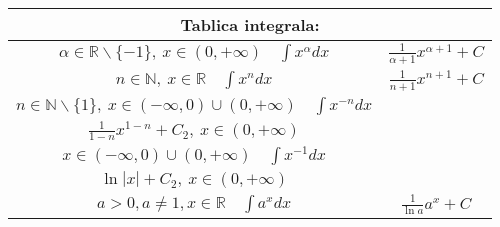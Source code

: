 \documentclass{article}
\begin{document}
\setlength{\tabcolsep}{2.65em}
\renewcommand{\arraystretch}{2.3}
\begin{tabular}{ |c|c|  }
    \hline
    \multicolumn{2}{|c|}{Tablica integrala:}                                                                                                                                                                                    \\ \hline
    $\alpha \in \mathbb{R} \backslash \{-1\},\ x\in(0, +\infty)\quad \int x^{\alpha} dx$                                               & $\frac{1}{\alpha + 1} x^{\alpha + 1} + C$                                              \\ \hline
    $n \in \mathbb{N},\ x \in \mathbb{R} \quad \int x^{n} dx$                                                                          & $\frac{1}{n + 1} x^{n + 1} + C$                                                        \\ \hline
    $n \in \mathbb{N}\backslash\{1\},\ x \in (-\infty, 0)\cup (0, +\infty)\quad \int x^{-n} dx $                                       &
    \makecell{
    $\frac{1}{1-n} x^{1-n} + C_1,\ x \in (-\infty, 0)$                                                                                                                                                                          \\
        $\frac{1}{1-n} x^{1-n} + C_2,\ x \in (0, +\infty)$
    }                                                                                                                                                                                                                           \\  \hline
    $x \in (-\infty, 0)\cup(0, +\infty)\quad \int x^{-1} dx$                                                                           &
    \makecell{ $\ln |x| + C_1,\ x \in (-\infty, 0)$                                                                                                                                                                             \\
    $\ln |x| + C_2,\ x \in (0, +\infty)$}                                                                                                                                                                                       \\ \hline
    $a > 0, a\neq 1, x \in \mathbb{R} \quad \int a^x dx                        $                                                       & $ \frac{1}{\ln a} a^x + C$                                                             \\ \hline

\end{tabular}
\end{document}
